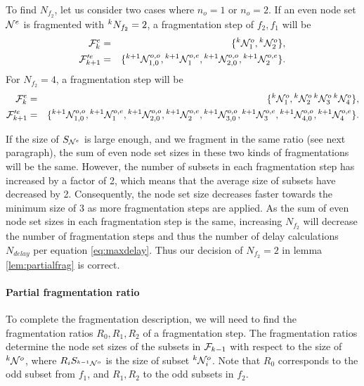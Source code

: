 To find $N_{f_2} $, let us consider two cases where $n_o = 1$ or $n_o=2$. If an even node set $\mathcal{N}^e$ is fragmented with ${}^{k}N_{f_2}=2$, a fragmentation step of $f_2, f_1$ will be
\begin{eqnarray*}
  \mathcal{F}^e_k &=& \{ {}^{k} \mathcal{N}^{o}_1, {}^{k} \mathcal{N}^{o}_2\},  \\
  \mathcal{F}'^e_{k+1} &=& \{{}^{k+1}\mathcal{N}^{o,o}_{1,0}, {}^{k+1}\mathcal{N}^{o,e}_1, {}^{k+1}\mathcal{N}^{o,o}_{2,0}, {}^{k+1}\mathcal{N}^{o,e}_2 \}.
\end{eqnarray*}
For $N_{f_2} = 4$, a fragmentation step will be
\begin{eqnarray*}
  \mathcal{F}^e_k &=& \{ {}^{k}\mathcal{N}^{o}_1, {}^{k}\mathcal{N}^{o}_2\,  {}^{k}\mathcal{N}^{o}_3\, {}^{k}\mathcal{N}^{o}_4\},  \\
  \mathcal{F}'^e_{k+1} &=& \{{}^{k+1}\mathcal{N}^{o,o}_{1,0}, {}^{k+1}\mathcal{N}^{o,e}_1,  {}^{k+1}\mathcal{N}^{o,o}_{2,0}, {}^{k+1}\mathcal{N}^{o,e}_2,  {}^{k+1}\mathcal{N}^{o,o}_{3,0}, {}^{k+1}\mathcal{N}^{o,e}_3, {}^{k+1}\mathcal{N}^{o,o}_{4,0}, {}^{k+1}\mathcal{N}^{o,e}_4 \}.
\end{eqnarray*}

If the size of $S_{\mathcal{N}^e}$ is large enough, and we fragment in the same ratio (see next paragraph), the sum of even node set sizes in these two kinds of fragmentations will be the same. However, the number of subsets in each fragmentation step has increased by a factor of 2, which means that the average size of subsets have decreased by 2. Consequently, the node set size decreases faster towards the minimum size of 3 as more fragmentation steps are applied. As the sum of even node set sizes in each fragmentation step is the same, increasing $N_{f_2}$ will decrease the number of fragmentation steps and thus the number of delay calculations $N_{delay}$ per equation \ref{eq:maxdelay}. Thus our decision of $N_{f_2}=2$ in lemma \ref{lem:partialfrag} is correct.

\paragraph{Partial fragmentation ratio}
To complete the fragmentation description, we will need to find the fragmentation ratios $R_0, R_1, R_2$ of a fragmentation step. The fragmentation ratios determine the node set sizes of the subsets in $\mathcal{F}_{k-1}$ with respect to the size of ${}^{k}\mathcal{N}^o$, where $R_i S_{{}^{k-1}\mathcal{N}^o}$ is the size of subset ${}^{k}\mathcal{N}^o_i$. Note that $R_0$ corresponds to the odd subset from $f_1$, and $R_1, R_2$ to the odd subsets in $f_2$.

